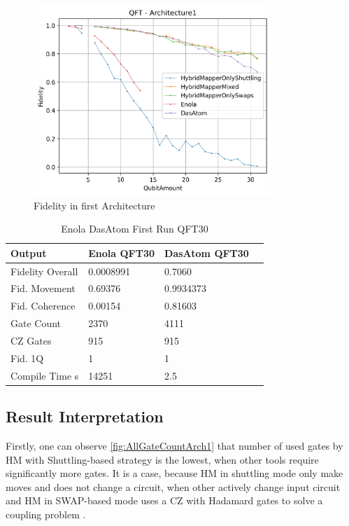 \begin{figure}[htbp]
  \centering
    \includegraphics[width=0.8\textwidth]{figures/FidelityArch1.png}
    \caption[Fidelity in first Architecture]{Fidelity in first Architecture}
    \label{fig:FidelityArch1}
\end{figure}
\begin{table}[htpb]
  \caption[Enola DasAtom First Run QFT30]{Enola DasAtom First Run QFT30}\label{tab:EnolaDasAtomQFT30}
  \centering
  \begin{tabular}{l l l l}
    \toprule
      Output & Enola QFT30 & DasAtom QFT30 \\
    \midrule
      Fidelity Overall & 0.0008991 & 0.7060\\
      Fid. Movement & 0.69376 & 0.9934373\\
      Fid. Coherence & 0.00154 & 0.81603\\
      Gate Count & 2370 & 4111\\
      CZ Gates & 915 & 915\\
      Fid. 1Q & 1 & 1\\
      Compile Time s & 14251 & 2.5\\
    \bottomrule
  \end{tabular}
\end{table}

\subsection{Result Interpretation}
Firstly, one can observe \ref{fig:AllGateCountArch1} that number of used gates by \ac{HM} with Shuttling-based strategy is the lowest, 
when other tools require significantly more gates. It is a case, because \ac{HM} in shuttling mode only make moves and does not change a circuit,
when other actively change input circuit and \ac{HM} in SWAP-based mode uses a CZ with Hadamard gates to solve a coupling problem \parencite{schmid2023hybridcircuitmappingleveraging,Emil_Khusainov_Bachelor_GIT}.

